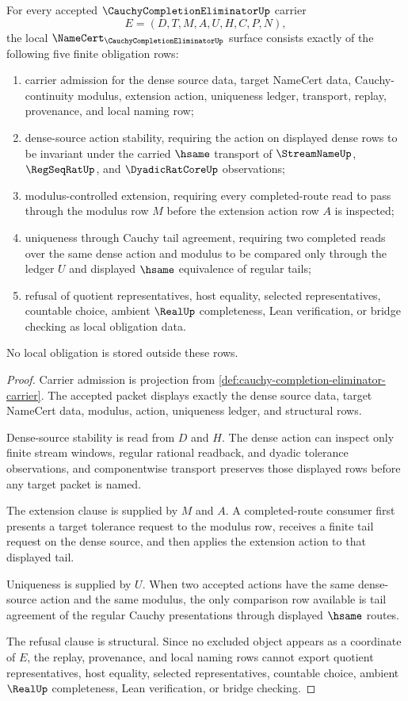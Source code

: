 \begin{theorem}
\label{thm:cauchy-completion-eliminator-namecert-obligations}
For every accepted $\CauchyCompletionEliminatorUp$ carrier
$$
E=(D,T,M,A,U,H,C,P,N),
$$
the local $\NameCert_{\CauchyCompletionEliminatorUp}$ surface consists exactly of the following five finite obligation rows:
\begin{enumerate}
\item carrier admission for the dense source data, target NameCert data, Cauchy-continuity modulus, extension action, uniqueness ledger, transport, replay, provenance, and local naming row;
\item dense-source action stability, requiring the action on displayed dense rows to be invariant under the carried $\hsame$ transport of $\StreamNameUp$, $\RegSeqRatUp$, and $\DyadicRatCoreUp$ observations;
\item modulus-controlled extension, requiring every completed-route read to pass through the modulus row $M$ before the extension action row $A$ is inspected;
\item uniqueness through Cauchy tail agreement, requiring two completed reads over the same dense action and modulus to be compared only through the ledger $U$ and displayed $\hsame$ equivalence of regular tails;
\item refusal of quotient representatives, host equality, selected representatives, countable choice, ambient $\RealUp$ completeness, Lean verification, or bridge checking as local obligation data.
\end{enumerate}
No local obligation is stored outside these rows.
\end{theorem}
\begin{proof}
Carrier admission is projection from \autoref{def:cauchy-completion-eliminator-carrier}. The accepted packet displays exactly the dense source data, target NameCert data, modulus, action, uniqueness ledger, and structural rows.

Dense-source stability is read from $D$ and $H$. The dense action can inspect only finite stream windows, regular rational readback, and dyadic tolerance observations, and componentwise transport preserves those displayed rows before any target packet is named.

The extension clause is supplied by $M$ and $A$. A completed-route consumer first presents a target tolerance request to the modulus row, receives a finite tail request on the dense source, and then applies the extension action to that displayed tail.

Uniqueness is supplied by $U$. When two accepted actions have the same dense-source action and the same modulus, the only comparison row available is tail agreement of the regular Cauchy presentations through displayed $\hsame$ routes.

The refusal clause is structural. Since no excluded object appears as a coordinate of $E$, the replay, provenance, and local naming rows cannot export quotient representatives, host equality, selected representatives, countable choice, ambient $\RealUp$ completeness, Lean verification, or bridge checking.
\end{proof}

